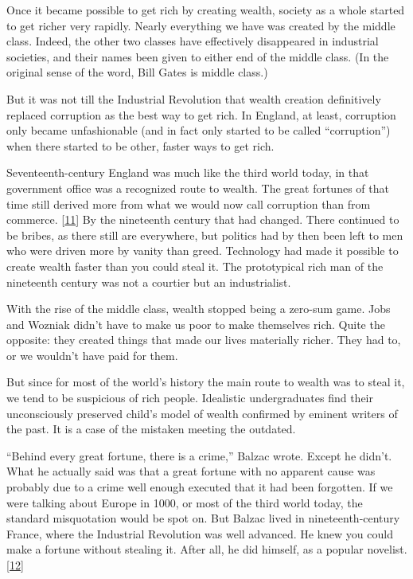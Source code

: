 Once it became possible to get rich by creating wealth, society as a
whole started to get richer very rapidly. Nearly everything we have was
created by the middle class. Indeed, the other two classes have
effectively disappeared in industrial societies, and their names been
given to either end of the middle class. (In the original sense of the
word, Bill Gates is middle class.)

But it was not till the Industrial Revolution that wealth creation
definitively replaced corruption as the best way to get rich. In
England, at least, corruption only became unfashionable (and in fact
only started to be called ``corruption'') when there started to be
other, faster ways to get rich.

Seventeenth-century England was much like the third world today, in that
government office was a recognized route to wealth. The great fortunes
of that time still derived more from what we would now call corruption
than from commerce. {[}\hyperref[f11n]{11}{]} By the nineteenth century
that had changed. There continued to be bribes, as there still are
everywhere, but politics had by then been left to men who were driven
more by vanity than greed. Technology had made it possible to create
wealth faster than you could steal it. The prototypical rich man of the
nineteenth century was not a courtier but an industrialist.

With the rise of the middle class, wealth stopped being a zero-sum game.
Jobs and Wozniak didn't have to make us poor to make themselves rich.
Quite the opposite: they created things that made our lives materially
richer. They had to, or we wouldn't have paid for them.

But since for most of the world's history the main route to wealth was
to steal it, we tend to be suspicious of rich people. Idealistic
undergraduates find their unconsciously preserved child's model of
wealth confirmed by eminent writers of the past. It is a case of the
mistaken meeting the outdated.

``Behind every great fortune, there is a crime,'' Balzac wrote. Except
he didn't. What he actually said was that a great fortune with no
apparent cause was probably due to a crime well enough executed that it
had been forgotten. If we were talking about Europe in 1000, or most of
the third world today, the standard misquotation would be spot on. But
Balzac lived in nineteenth-century France, where the Industrial
Revolution was well advanced. He knew you could make a fortune without
stealing it. After all, he did himself, as a popular novelist.
{[}\hyperref[f12n]{12}{]}

